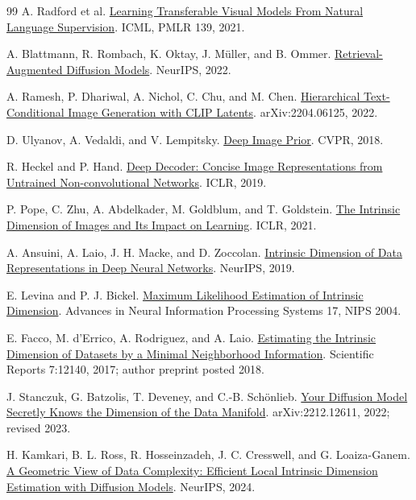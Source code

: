 \documentclass[11pt,a4paper]{article}
\theoremstyle{definition}
\theoremstyle{definition}
\theoremstyle{remark}\newtheorem{remark}[theorem]{Remark}
\begin{document}
\begin{thebibliography}{99}
A. Radford et al.
\href{https://proceedings.mlr.press/v139/radford21a.html}{Learning Transferable Visual Models From Natural Language Supervision}.
ICML, PMLR 139, 2021.

A. Blattmann, R. Rombach, K. Oktay, J. M\"uller, and B. Ommer.
\href{https://proceedings.neurips.cc/paper_files/paper/2022/hash/62868cc2fc1eb5cdf321d05b4b88510c-Abstract-Conference.html}{Retrieval-Augmented Diffusion Models}.
NeurIPS, 2022.

A. Ramesh, P. Dhariwal, A. Nichol, C. Chu, and M. Chen.
\href{https://arxiv.org/abs/2204.06125}{Hierarchical Text-Conditional Image Generation with CLIP Latents}.
arXiv:2204.06125, 2022.

D. Ulyanov, A. Vedaldi, and V. Lempitsky.
\href{https://openaccess.thecvf.com/content_cvpr_2018/html/Ulyanov_Deep_Image_Prior_CVPR_2018_paper.html}{Deep Image Prior}.
CVPR, 2018.

R. Heckel and P. Hand.
\href{https://arxiv.org/abs/1810.03982}{Deep Decoder: Concise Image Representations from Untrained Non-convolutional Networks}.
ICLR, 2019.

P. Pope, C. Zhu, A. Abdelkader, M. Goldblum, and T. Goldstein.
\href{https://arxiv.org/abs/2104.08894}{The Intrinsic Dimension of Images and Its Impact on Learning}.
ICLR, 2021.

A. Ansuini, A. Laio, J. H. Macke, and D. Zoccolan.
\href{https://arxiv.org/abs/1905.12784}{Intrinsic Dimension of Data Representations in Deep Neural Networks}.
NeurIPS, 2019.

E. Levina and P. J. Bickel.
\href{https://proceedings.neurips.cc/paper/2004/file/74934548253bcab8490ebd74afed7031-Paper.pdf}{Maximum Likelihood Estimation of Intrinsic Dimension}.
Advances in Neural Information Processing Systems 17, NIPS 2004.

E. Facco, M. d'Errico, A. Rodriguez, and A. Laio.
\href{https://arxiv.org/abs/1803.06992}{Estimating the Intrinsic Dimension of Datasets by a Minimal Neighborhood Information}.
Scientific Reports 7:12140, 2017; author preprint posted 2018.

J. Stanczuk, G. Batzolis, T. Deveney, and C.-B. Sch\"onlieb.
\href{https://arxiv.org/abs/2212.12611}{Your Diffusion Model Secretly Knows the Dimension of the Data Manifold}.
arXiv:2212.12611, 2022; revised 2023.

H. Kamkari, B. L. Ross, R. Hosseinzadeh, J. C. Cresswell, and G. Loaiza-Ganem.
\href{https://arxiv.org/abs/2406.03537}{A Geometric View of Data Complexity: Efficient Local Intrinsic Dimension Estimation with Diffusion Models}.
NeurIPS, 2024.


\end{thebibliography}
\end{document}
